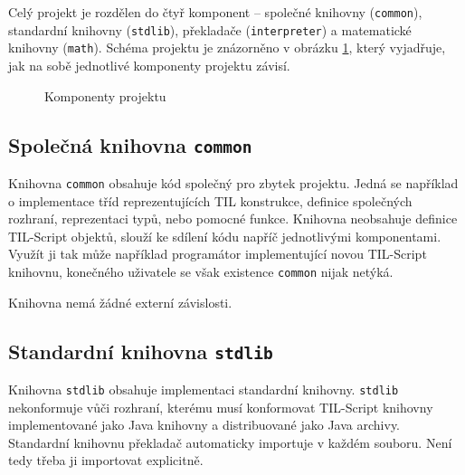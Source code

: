 Celý projekt je rozdělen do čtyř komponent -- společné knihovny (\lstinline{common}), standardní
knihovny (\lstinline{stdlib}), překladače (\lstinline{interpreter}) a matematické knihovny
(\lstinline{math}). Schéma projektu je znázorněno v obrázku \ref{fig:project-structure}, který
vyjadřuje, jak na sobě jednotlivé komponenty projektu závisí.

\begin{figure}
    \centering
    \caption{Komponenty projektu}
    \label{fig:project-structure}
\end{figure}

\subsection{Společná knihovna \lstinline{common}}

Knihovna \lstinline{common} obsahuje kód společný pro zbytek projektu. Jedná se například
o implementace tříd reprezentujících TIL konstrukce, definice společných rozhraní, reprezentaci
typů, nebo pomocné funkce. Knihovna neobsahuje definice TIL-Script objektů, slouží ke sdílení kódu
napříč jednotlivými komponentami. Využít ji tak může například programátor implementující novou
TIL-Script knihovnu, konečného uživatele se však existence \lstinline{common} nijak netýká.

Knihovna nemá žádné externí závislosti.

\subsection{Standardní knihovna \lstinline{stdlib}}

Knihovna \lstinline{stdlib} obsahuje implementaci standardní knihovny. \lstinline{stdlib}
nekonformuje vůči rozhraní, kterému musí konformovat TIL-Script knihovny implementované jako Java
knihovny a distribuované jako Java archivy. Standardní knihovnu překladač automaticky importuje
v každém souboru. Není tedy třeba ji importovat explicitně.

